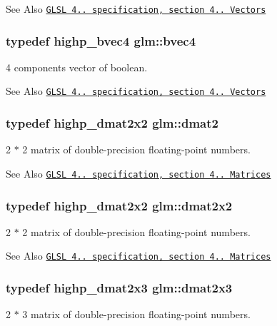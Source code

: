 \begin{DoxySeeAlso}{See Also}
\href{http://www.opengl.org/registry/doc/GLSLangSpec.4.20.8.pdf}{\tt G\-L\-S\-L 4.. specification, section 4.. Vectors} 
\end{DoxySeeAlso}
\hypertarget{group__core__types_ga6bb211b3d3bebae3867548d5673ca5cd}{
\subsubsection[{bvec4}]{\setlength{\rightskip}{0pt plus 5cm}typedef highp\-\_\-bvec4 {\bf glm\-::bvec4}}}\label{group__core__types_ga6bb211b3d3bebae3867548d5673ca5cd}
4 components vector of boolean.

\begin{DoxySeeAlso}{See Also}
\href{http://www.opengl.org/registry/doc/GLSLangSpec.4.20.8.pdf}{\tt G\-L\-S\-L 4.. specification, section 4.. Vectors} 
\end{DoxySeeAlso}
\hypertarget{group__core__types_gad8c130d26c4cd9a1a831c1a74292a8f6}{
\subsubsection[{dmat2}]{\setlength{\rightskip}{0pt plus 5cm}typedef highp\-\_\-dmat2x2 {\bf glm\-::dmat2}}}\label{group__core__types_gad8c130d26c4cd9a1a831c1a74292a8f6}
2 $\ast$ 2 matrix of double-\/precision floating-\/point numbers.

\begin{DoxySeeAlso}{See Also}
\href{http://www.opengl.org/registry/doc/GLSLangSpec.4.20.8.pdf}{\tt G\-L\-S\-L 4.. specification, section 4.. Matrices} 
\end{DoxySeeAlso}
\hypertarget{group__core__types_gae9932771e11a4f38e21f1136423bab18}{
\subsubsection[{dmat2x2}]{\setlength{\rightskip}{0pt plus 5cm}typedef highp\-\_\-dmat2x2 {\bf glm\-::dmat2x2}}}\label{group__core__types_gae9932771e11a4f38e21f1136423bab18}
2 $\ast$ 2 matrix of double-\/precision floating-\/point numbers.

\begin{DoxySeeAlso}{See Also}
\href{http://www.opengl.org/registry/doc/GLSLangSpec.4.20.8.pdf}{\tt G\-L\-S\-L 4.. specification, section 4.. Matrices} 
\end{DoxySeeAlso}
\hypertarget{group__core__types_ga6b5ff9888ca0e468f35b637d4c3a361d}{
\subsubsection[{dmat2x3}]{\setlength{\rightskip}{0pt plus 5cm}typedef highp\-\_\-dmat2x3 {\bf glm\-::dmat2x3}}}\label{group__core__types_ga6b5ff9888ca0e468f35b637d4c3a361d}
2 $\ast$ 3 matrix of double-\/precision floating-\/point numbers.

